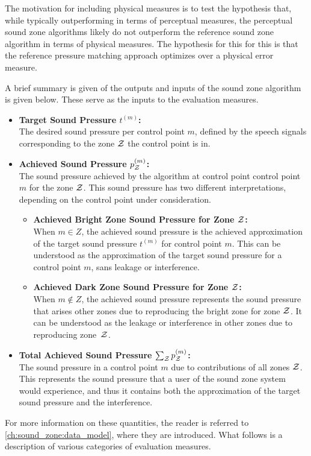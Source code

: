The motivation for including physical measures is to test the hypothesis that, 
while typically outperforming in terms of perceptual measures, the perceptual sound zone algorithms likely do not 
outperform the reference sound zone algorithm in terms of physical measures.
The hypothesis for this for this is that the reference pressure matching approach optimizes over a physical error measure.

A brief summary is given of the outputs and inputs of the sound zone algorithm is given below.
These serve as the inputs to the evaluation measures.
\begin{itemize}
    \item \textbf{Target Sound Pressure $t^{(m)}$:}\\
        The desired sound pressure per control point $m$, defined by the speech signals 
        corresponding to the zone $\mathcal{Z}$ the control point is in.
    \item \textbf{Achieved Sound Pressure $p_{\mathcal{Z}}^{(m)}$:}\\
        The sound pressure achieved by the algorithm at control point control point $m$ for the zone $\mathcal{Z}$.
        This sound pressure has two different interpretations, depending on the control point under consideration.
        \begin{itemize}
            \item \textbf{Achieved Bright Zone Sound Pressure for Zone $\mathcal{Z}$:}\\
                When $m \in Z$, the achieved sound pressure is the achieved approximation of the 
                target sound pressure $t^{(m)}$ for control point $m$.
                This can be understood as the approximation of the target sound pressure for a control point $m$, sans leakage or interference. 
            \item \textbf{Achieved Dark Zone Sound Pressure for Zone $\mathcal{Z}$:}\\
                When $m \notin Z$, the achieved sound pressure represents the sound pressure 
                that arises other zones due to reproducing the bright zone for zone $\mathcal{Z}$. 
                It can be understood as the leakage or interference in other zones due to reproducing zone~$\mathcal{Z}$.
        \end{itemize}
    \item \textbf{Total Achieved Sound Pressure $\sum_{\mathcal{Z}} p_{\mathcal{Z}}^{(m)}$:}\\
        The sound pressure in a control point $m$ due to contributions of all zones $\mathcal{Z}$.
        This represents the sound pressure that a user of the sound zone system would experience,
        and thus it contains both the approximation of the target sound pressure and the interference.
\end{itemize}
For more information on these quantities, the reader is referred to \autoref{ch:sound_zone:data_model}, where they 
are introduced.
What follows is a description of various categories of evaluation measures.

